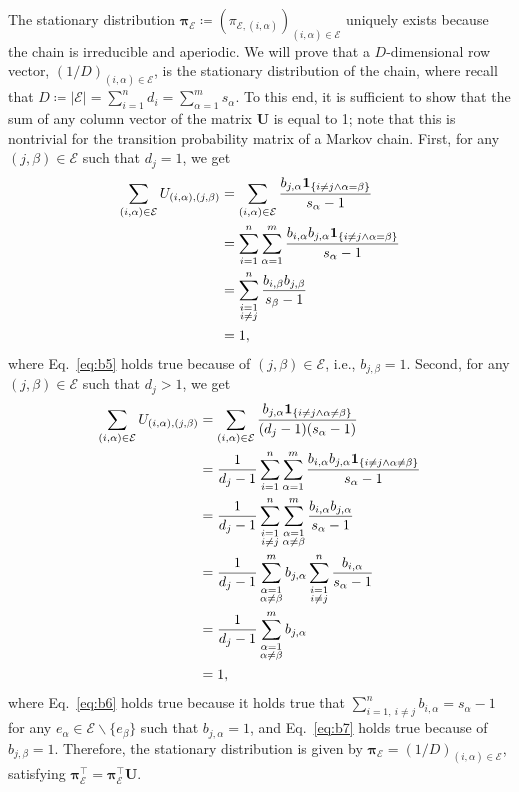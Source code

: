 The stationary distribution $\bm{\pi}_{\mathcal{E}} \coloneq (\pi_{\mathcal{E}, (i, \alpha)})_{(i, \alpha) \in \mathcal{E}}$ uniquely exists because the chain is irreducible and aperiodic.
We will prove that a $D$-dimensional row vector, $(1/D)_{(i, \alpha) \in \mathcal{E}}$, is the stationary distribution of the chain, where recall that $D \coloneq |\mathcal{E}| = \sum_{i=1}^n d_i = \sum_{\alpha=1}^m s_{\alpha}$.
To this end, it is sufficient to show that the sum of any column vector of the matrix $\bm{U}$ is equal to 1; note that this is nontrivial for the transition probability matrix of a Markov chain.
First, for any $(j, \beta) \in \mathcal{E}$ such that $d_j = 1$, we get
\begin{align}
\sum_{(i, \alpha) \in \mathcal{E}} U_{(i, \alpha), (j, \beta)} &= \sum_{(i, \alpha) \in \mathcal{E}} \frac{b_{j, \alpha} \bm{1}_{\{i \neq j \land \alpha = \beta\}}}{s_{\alpha} - 1} \notag \\
&= \sum_{i=1}^n \sum_{\alpha=1}^m \frac{b_{i, \alpha} b_{j, \alpha} \bm{1}_{\{i \neq j \land \alpha = \beta\}}}{s_{\alpha} - 1} \notag\\
&= \sum_{\substack{i=1 \\ i \neq j}}^n \frac{b_{i, \beta} b_{j, \beta}}{s_{\beta} - 1} \notag\\
&= 1, \label{eq:b5}
\end{align}
where Eq.~\eqref{eq:b5} holds true because of $(j, \beta) \in \mathcal{E}$, i.e., $b_{j, \beta} = 1$.
Second, for any $(j, \beta) \in \mathcal{E}$ such that $d_j > 1$, we get
\begin{align}
\sum_{(i, \alpha) \in \mathcal{E}} U_{(i, \alpha), (j, \beta)} &= \sum_{(i, \alpha) \in \mathcal{E}} \frac{b_{j, \alpha} \bm{1}_{\{i \neq j \land \alpha \neq \beta\}}}{(d_j-1)(s_{\alpha} - 1)} \notag \\
&= \frac{1}{d_j-1} \sum_{i=1}^n \sum_{\alpha=1}^m \frac{b_{i, \alpha} b_{j, \alpha} \bm{1}_{\{i \neq j \land \alpha \neq \beta\}}}{s_{\alpha} - 1} \notag \\
&= \frac{1}{d_j-1} \sum_{\substack{i=1 \\ i \neq j}}^n \sum_{\substack{\alpha=1 \\ \alpha \neq \beta}}^m \frac{b_{i, \alpha} b_{j, \alpha}}{s_{\alpha} - 1} \notag \\
&= \frac{1}{d_j-1} \sum_{\substack{\alpha=1 \\ \alpha \neq \beta}}^m b_{j, \alpha} \sum_{\substack{i=1 \\ i \neq j}}^n \frac{b_{i, \alpha}}{s_{\alpha} - 1} \notag \\
&= \frac{1}{d_j-1} \sum_{\substack{\alpha=1 \\ \alpha \neq \beta}}^m b_{j, \alpha} \label{eq:b6} \\
&= 1, \label{eq:b7}
\end{align}
where Eq.~\eqref{eq:b6} holds true because it holds true that $\sum_{i=1,\ i \neq j}^n b_{i, \alpha} = s_{\alpha}-1$ for any $e_{\alpha} \in \mathcal{E} \backslash \{e_{\beta}\}$ such that $b_{j, \alpha} = 1$, and Eq.~\eqref{eq:b7} holds true because of $b_{j, \beta} = 1$.
Therefore, the stationary distribution is given by $\bm{\pi}_{\mathcal{E}} = (1 / D)_{(i, \alpha) \in \mathcal{E}}$, satisfying $\bm{\pi}_{\mathcal{E}}^\top = \bm{\pi}_{\mathcal{E}}^\top \bm{U}$.
